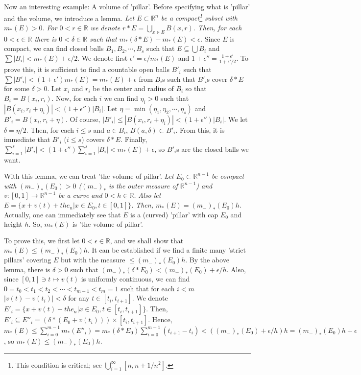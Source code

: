 \documentclass{article}
\newcommand{\ReR}{\mathbb{R}}
\newcommand{\SBar}{|}
\begin{document}
Now an interesting example: A volume of 'pillar'.
Before specifying what is 'pillar' and the volume, we introduce a lemma.
\textit{Let $E \subset \ReR^n$ be a compact\footnote{This condition is critical; see $\bigcup_{i = 1}^\infty [n, n + 1/n^2]$.} subset with $m_*(E) > 0$.}
\textit{For $0 < r \in \ReR$ we denote $r * E = \bigcup_{x \in E} B(x, r)$.}
\textit{Then, for each $0 < \epsilon \in \ReR$ there is $0 < \delta \in \ReR$ such that $m_*(\delta * E) - m_*(E) < \epsilon$.}
Since $E$ is compact, we can find closed balls $B_1, B_2, \cdots, B_s$ such that $E \subseteq \bigcup B_i$ and $\sum |B_i| < m_*(E) + \epsilon / 2$.
We denote first $\epsilon' = \epsilon / m_*(E)$ and $1 + \epsilon'' = \frac{1 + \epsilon'}{1 + \epsilon' / 2}$.
To prove this, it is sufficient to find a countable open balls $B'_i$ such that $\sum |B'_i| < (1 + \epsilon') m_*(E) = m_*(E) + \epsilon$ from $B_i$s such that $B'_i$s cover $\delta * E$ for some $\delta > 0$.
Let $x_i$ and $r_i$ be the center and radius of $B_i$ so that $B_i = B(x_i, r_i)$.
Now, for each $i$ we can find $\eta_i > 0$ such that $|B(x_i, r_i + \eta_i)| < (1 + \epsilon'') |B_i|$.
Let $\eta = \min(\eta_1, \eta_2, \cdots, \eta_s)$ and $B'_i = B(x_i, r_i + \eta)$.
Of course, $|B'_i| \le |B(x_i, r_i + \eta_i)| < (1 + \epsilon'') |B_i|$.
We let $\delta = \eta / 2$.
Then, for each $i \le s$ and $a \in B_i$, $B(a, \delta) \subset B'_i$.
From this, it is immediate that $B'_i$ ($i \le s$) covers $\delta * E$.
Finally, $\sum_{i = 1}^s |B'_i| < (1 + \epsilon'') \sum_{i = 1}^s |B_i| < m_*(E) + \epsilon$, so $B'_i$s are the closed balls we want.

With this lemma, we can treat 'the volume of pillar'.
\textit{Let $E_0 \subset \ReR^{n - 1}$ be compact with $(m_-)_*(E_0) > 0$ ($(m_-)_*$ is the outer measure of $\ReR^{n - 1}$) and $v : [0, 1] \to \ReR^{n - 1}$ be a curve and $0 < h \in \ReR$.}
\textit{Also let $E = \{ x + v(t) + the_n \SBar x \in E_0, t \in [0, 1] \}$.}
\textit{Then, $m_*(E) = (m_-)_*(E_0)h$.}
Actually, one can immediately see that $E$ is a (curved) 'pillar' with cap $E_0$ and height $h$.
So, $m_*(E)$ is 'the volume of pillar'.

To prove this, we first let $0 < \epsilon \in \ReR$, and we shall show that $m_*(E) \le (m_-)_*(E_0) h$.
It can be established if we find a finite many 'strict pillars' covering $E$ but with the measure $\le (m_-)_*(E_0) h$.
By the above lemma, there is $\delta > 0$ such that $(m_-)_*(\delta * E_0) < (m_-)_*(E_0) + \epsilon / h$.
Also, since $[0, 1] \ni t \mapsto v(t)$ is uniformly continuous, we can find $0 = t_0 < t_1 < t_2 < \cdots < t_{m - 1} < t_m = 1$ such that for each $i < m$ $|v(t) - v(t_i)| < \delta$ for any $t \in [t_i, t_{i + 1}]$.
We denote $E'_i = \{ x + v(t) + the_n \SBar x \in E_0, t \in [t_i, t_{i + 1}] \}$.
Then, $E'_i \subseteq E''_i = (\delta * (E_0 + v(t_i))) \times [t_i, t_{i + 1}]$.
Hence, $m_*(E) \le \sum_{i = 0}^{m - 1} m_*(E''_i) = m_*(\delta * E_0) \sum_{i = 0}^{m - 1} (t_{i + 1} - t_i) < ((m_-)_*(E_0) + \epsilon / h) h = (m_-)_*(E_0) h + \epsilon$, so $m_*(E) \le (m_-)_*(E_0) h$.
\end{document}
